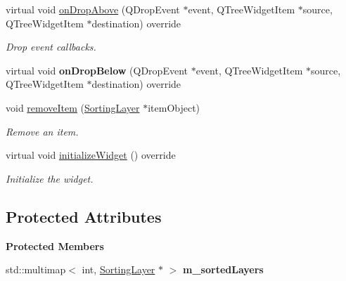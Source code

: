 \begin{Indent}
\begin{DoxyCompactItemize}
\mbox{\label{classrev_1_1_view_1_1_script_order_tree_widget_a549f70d9c2734432275ef2418a0534a2}} 
virtual void \mbox{\hyperlink{classrev_1_1_view_1_1_script_order_tree_widget_a549f70d9c2734432275ef2418a0534a2}{on\+Drop\+Above}} (Q\+Drop\+Event $\ast$event, Q\+Tree\+Widget\+Item $\ast$source, Q\+Tree\+Widget\+Item $\ast$destination) override
\begin{DoxyCompactList}\small\item\em Drop event callbacks. \end{DoxyCompactList}\item 
\mbox{\label{classrev_1_1_view_1_1_script_order_tree_widget_af0382f70220a5a65b318d9bf6d69f150}} 
virtual void {\bfseries on\+Drop\+Below} (Q\+Drop\+Event $\ast$event, Q\+Tree\+Widget\+Item $\ast$source, Q\+Tree\+Widget\+Item $\ast$destination) override
\item 
\mbox{\label{classrev_1_1_view_1_1_script_order_tree_widget_abae730806ee6bdbd22f324afa59f7116}} 
void \mbox{\hyperlink{classrev_1_1_view_1_1_script_order_tree_widget_abae730806ee6bdbd22f324afa59f7116}{remove\+Item}} (\mbox{\hyperlink{structrev_1_1_sorting_layer}{Sorting\+Layer}} $\ast$item\+Object)
\begin{DoxyCompactList}\small\item\em Remove an item. \end{DoxyCompactList}\item 
\mbox{\label{classrev_1_1_view_1_1_script_order_tree_widget_a0aca1a41ed4fb22717891432a5d7ab1e}} 
virtual void \mbox{\hyperlink{classrev_1_1_view_1_1_script_order_tree_widget_a0aca1a41ed4fb22717891432a5d7ab1e}{initialize\+Widget}} () override
\begin{DoxyCompactList}\small\item\em Initialize the widget. \end{DoxyCompactList}\end{DoxyCompactItemize}
\end{Indent}
\subsection*{Protected Attributes}
\begin{Indent}\textbf{ Protected Members}\par
\begin{DoxyCompactItemize}
\item 
\mbox{\label{classrev_1_1_view_1_1_script_order_tree_widget_a54cab110b139bd626f041a626d0f2b15}} 
std\+::multimap$<$ int, \mbox{\hyperlink{structrev_1_1_sorting_layer}{Sorting\+Layer}} $\ast$ $>$ {\bfseries m\+\_\+sorted\+Layers}
\end{DoxyCompactItemize}
\end{Indent}
